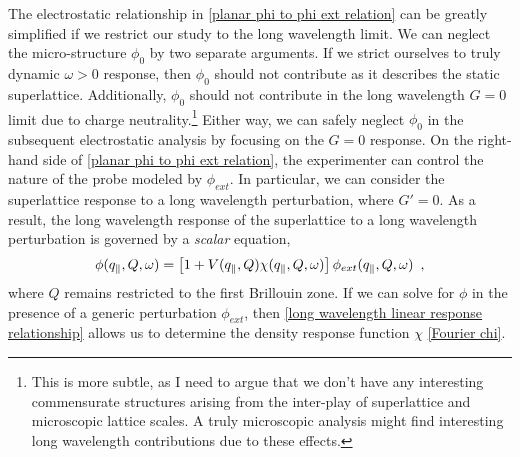 The electrostatic relationship in \eqref{planar phi to phi ext relation} can be greatly simplified if we restrict our study to the long wavelength limit.  We can neglect the micro-structure $\phi_0$ by two separate arguments.  If we strict ourselves to truly dynamic $\omega>0$ response, then $\phi_0$ should not contribute as it describes the static superlattice.  Additionally, $\phi_0$ should not contribute in the long wavelength $G=0$ limit due to charge neutrality.\footnote{This is more subtle, as I need to argue that we don't have any interesting commensurate structures arising from the inter-play of superlattice and microscopic lattice scales.  A truly microscopic analysis might find interesting long wavelength contributions due to these effects.}  Either way, we can safely neglect $\phi_0$ in the subsequent electrostatic analysis by focusing on the $G=0$ response.  On the right-hand side of \eqref{planar phi to phi ext relation}, the experimenter can control the nature of the probe modeled by $\phi_{ext}$.  In particular, we can consider the superlattice response to a long wavelength perturbation, where $G'=0$.  As a result, the long wavelength response of the superlattice to a long wavelength perturbation is governed by a {\it scalar} equation,
\begin{equation}
    \label{long wavelength linear response relationship}
    \phi(q_\parallel, Q, \omega) 
    =
    \left[
    1
    +
    V(q_\parallel, Q)
    \chi(q_\parallel, Q, \omega)
    \right]
    \phi_{ext}(q_\parallel, Q, \omega)
    \,\,\,,
\end{equation}
where $Q$ remains restricted to the first Brillouin zone.  If we can solve for $\phi$ in the presence of a generic perturbation $\phi_{ext}$, then \eqref{long wavelength linear response relationship} allows us to determine the density response function $\chi$ \eqref{Fourier chi}.